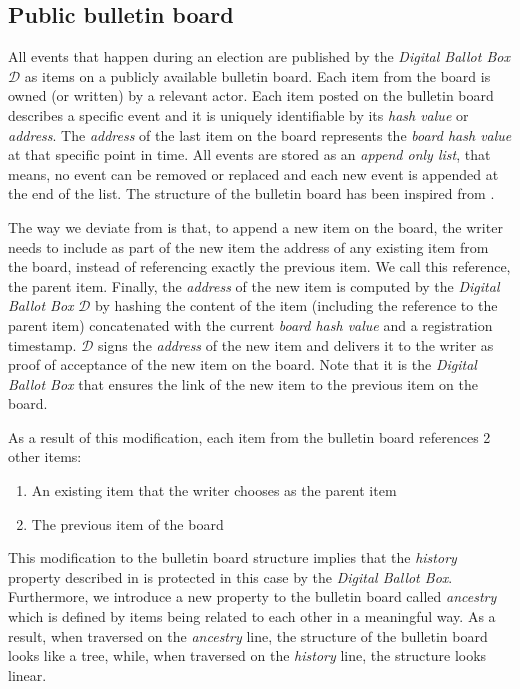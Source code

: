 \subsection{Public bulletin board} \label{sec: public bulletin board}
All events that happen during an election are published by the \textit{Digital Ballot Box} $\mathcal{D}$ as items on a publicly available bulletin board. Each item from the board is owned (or written) by a relevant actor. Each item posted on the bulletin board describes a specific event and it is uniquely identifiable by its \textit{hash value} or \textit{address}. The \textit{address} of the last item on the board represents the \textit{board hash value} at that specific point in time. All events are stored as an \textit{append only list}, that means, no event can be removed or replaced and each new event is appended at the end of the list. The structure of the bulletin board has been inspired from \cite{Heather09}.

The way we deviate from \cite{Heather09} is that, to append a new item on the board, the writer needs to include as part of the new item the address of any existing item from the board, instead of referencing exactly the previous item. We call this reference, the parent item. Finally, the \textit{address} of the new item is computed by the \textit{Digital Ballot Box} $\mathcal{D}$ by hashing the content of the item (including the reference to the parent item) concatenated with the current \textit{board hash value} and a registration timestamp. $\mathcal{D}$ signs the \textit{address} of the new item and delivers it to the writer as proof of acceptance of the new item on the board. Note that it is the \textit{Digital Ballot Box} that ensures the link of the new item to the previous item on the board.

As a result of this modification, each item from the bulletin board references 2 other items:
\begin{enumerate}
    \item An existing item that the writer chooses as the parent item
    \item The previous item of the board
\end{enumerate}

This modification to the bulletin board structure implies that the \textit{history} property described in \cite{Heather09} is protected in this case by the \textit{Digital Ballot Box}. Furthermore, we introduce a new property to the bulletin board called \textit{ancestry} which is defined by items being related to each other in a meaningful way. As a result, when traversed on the \textit{ancestry} line, the structure of the bulletin board looks like a tree, while, when traversed on the \textit{history} line, the structure looks linear. 

